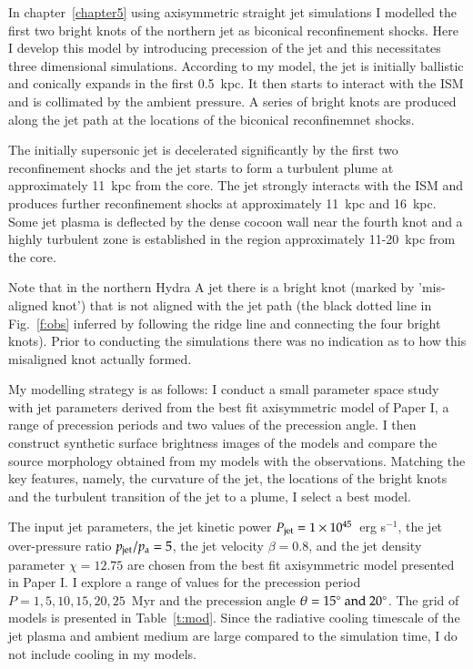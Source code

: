 In chapter~\ref{chapter5} using axisymmetric straight jet simulations I modelled the first two bright knots of the northern jet as biconical reconfinement shocks. Here I develop this model by introducing precession of the jet and this necessitates three dimensional simulations.  According to my model, the jet is initially ballistic and conically expands in the first 0.5~kpc. It then starts to interact with the ISM and is collimated by the ambient pressure. A series of bright knots are produced along the jet path at the locations of the biconical reconfinemnet shocks. 

The initially supersonic jet is decelerated significantly by the first two reconfinement shocks and the jet starts to form a turbulent plume at approximately 11~kpc from the core. The jet strongly interacts with the ISM and produces further reconfinement shocks at approximately 11~kpc and 16~kpc. Some jet plasma is deflected by the dense cocoon wall near the fourth knot and a highly turbulent zone is established in the region approximately 11-20~kpc from the core. 

Note that in the northern Hydra A jet there is a bright knot (marked by 'mis-aligned knot') that is not aligned with the jet path (the black dotted line in Fig.~\ref{f:obs} inferred by following the ridge line and connecting the four bright knots). Prior to conducting the simulations there was no indication as to how this misaligned knot actually formed. 

My modelling strategy is as follows: I conduct a small parameter space study with jet parameters derived from the best fit axisymmetric model of Paper I, a range of precession periods and two values of the precession angle.  I then construct synthetic surface brightness images of the models and compare the source morphology obtained from my models with the observations. Matching the key features, namely, the curvature of the jet, the locations of the bright knots and the turbulent transition of the jet to a plume, I select a best model. 

The input jet parameters, the jet kinetic power $P_{\rm jet} = 1\times 10^{45}$~erg s$^{-1}$, the jet over-pressure ratio $p_{\rm jet}/p_{\rm a} = 5$, the jet velocity $\beta = 0.8$, and the jet density parameter $\chi = 12.75$ are chosen from the best fit axisymmetric model presented in Paper I. I explore a range of values for the precession period $P = 1, 5, 10, 15, 20, 25$~Myr and the precession angle $\theta = 15^{\circ} \rm \ and \ 20^{\circ}$. The grid of models is presented in Table~\ref{t:mod}. Since the radiative cooling timescale of the jet plasma and ambient medium are large compared to the simulation time, I do not include cooling in my models. 

